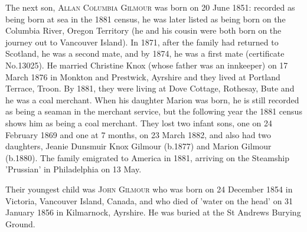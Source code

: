 The next son, \textsc{Allan Columbia Gilmour} was born on 20 June 1851: recorded as being born at sea in the 1881 census, he was later listed as being born on the Columbia River, Oregon Territory (he and his cousin were both born on the journey out to Vancouver Island). In 1871, after the family had returned to Scotland, he was a second mate, and by 1874, he was a first mate (certificate No.13025). He married Christine Knox (whose father was an innkeeper) on 17 March 1876 in Monkton and Prestwick, Ayrshire and they lived at Portland Terrace, Troon. By 1881, they were living at Dove Cottage, Rothesay, Bute and he was a coal merchant.   When his daughter Marion was born, he is still recorded as being a seaman in the merchant service, but the following year the 1881 census shows him as being a coal merchant. They lost two infant sons, one on 24 February 1869 and one at 7 months, on 23 March 1882, and also had two daughters, Jeanie Dunsmuir Knox Gilmour (b.1877) and Marion Gilmour (b.1880). The family emigrated to America in 1881, arriving on the Steamship 'Prussian' in Philadelphia on 13 May.

Their youngest child was \textsc{John Gilmour} who was born on 24 December 1854 in Victoria, Vancouver Island, Canada, and who died of 'water on the head' on 31 January 1856 in Kilmarnock, Ayrshire. He was buried at the St Andrews Burying Ground.



  

